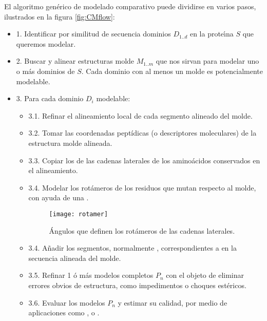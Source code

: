 El algoritmo gen\'{e}rico de modelado comparativo puede dividirse en varios pasos, ilustrados en la figura \ref{fig:CMflow}:
\begin{itemize}
\item{1.} Identificar por similitud de secuencia dominios $D_{1..d}$ en la prote\'\i{}na $S$ que queremos modelar.
\item{2.} Buscar y alinear estructuras molde $M_{1..m}$ que nos sirvan para modelar uno o m\'{a}s dominios de $S$. 
Cada dominio con al menos un molde es potencialmente modelable.
\item{3.} Para cada dominio $D_{i}$ modelable:
\begin{itemize}
\item{3.1.} Refinar el alineamiento local de cada segmento alineado del molde.
\item{3.2.} Tomar las coordenadas pept\'{i}dicas (o descriptores moleculares) de la estructura molde alineada.
\item{3.3.} Copiar los 
de las cadenas laterales de los amino\'{a}cidos conservados en el alineamiento.
\item{3.4.} Modelar los rot\'{a}meros de los residuos que mutan respecto al molde, 
con ayuda de una .
\begin{figure}
\begin{center} 
\texttt{[image: rotamer]}
\caption%
{
\'{A}ngulos que definen los rot\'{a}meros de las cadenas laterales.
}
\label{fig:rotamer}
\end{center}
\end{figure}
\item{3.4.} A\~nadir los segmentos, normalmente , 
correspondientes a  en la secuencia alineada del molde.
\item{3.5.} Refinar 1 \'{o} m\'{a}s modelos completos $P_{n}$ con el objeto de eliminar errores obvios de estructura, como impedimentos o choques est\'{e}ricos.
\item{3.6.} Evaluar los modelos $P_{n}$  y estimar su calidad, por medio de aplicaciones como 
,
 o 
.
\end{itemize}
\end{itemize}


